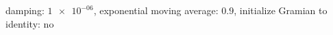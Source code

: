 damping: $\num[scientific-notation=true]{1e-06}$, exponential moving average: $\num[scientific-notation=true]{0.9}$, initialize Gramian to identity: no